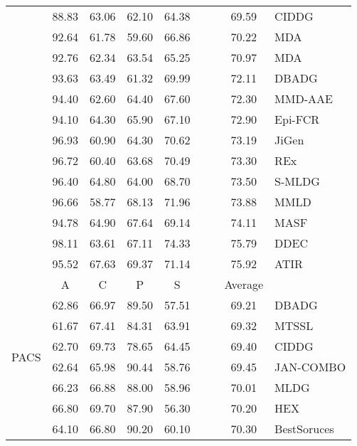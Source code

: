 \documentclass{article}
\begin{document}
\begin{table}
\begin{center}
\begin{small}
{\begin{tabular}{p{1.5cm}cccccccl}
& 88.83 & 63.06 & 62.10 & 64.38 &       &       & 69.59 & CIDDG \citep{li2018deep}\\
& 92.64 & 61.78 & 59.60 & 66.86 &       &       & 70.22 & MDA \citep{hu2019domain}\\
& 92.76 & 62.34 & 63.54 & 65.25 &       &       & 70.97 & MDA \citep{ding2017deep}\\
& 93.63 & 63.49 & 61.32 & 69.99 &       &       & 72.11 & DBADG \citep{Li_2017_ICCV}\\
& 94.40 & 62.60 & 64.40 & 67.60 &       &       & 72.30 & MMD-AAE \citep{li2018domain}\\
& 94.10 & 64.30 & 65.90 & 67.10 &       &       & 72.90 & Epi-FCR \citep{li2019episodic}\\
& 96.93 & 60.90 & 64.30 & 70.62 &       &       & 73.19 & JiGen \citep{carlucci2019domain}\\
& 96.72 & 60.40 & 63.68 & 70.49 &       &       & 73.30 & REx \citep{krueger2020out}\\
& 96.40 & 64.80 & 64.00 & 68.70 &       &       & 73.50 & S-MLDG \citep{li2020sequential}\\
& 96.66 & 58.77 & 68.13 & 71.96 &       &       & 73.88 & MMLD \citep{matsuura2019domain}\\
& 94.78 & 64.90 & 67.64 & 69.14 &       &       & 74.11 & MASF \citep{dou2019domain}\\
& 98.11 & 63.61 & 67.11 & 74.33 &       &       & 75.79 & DDEC \citep{asadi2019towards}\\
& 95.52 & 67.63 & 69.37 & 71.14 &       &       & 75.92 & ATIR \citep{albuquerque2019a}\\
\midrule
\multirow{20}{*}{PACS}&     A &     C &     P &     S &       &       & Average & \\
& 62.86 & 66.97 & 89.50 & 57.51 &       &       & 69.21 & DBADG \citep{Li_2017_ICCV}\\
& 61.67 & 67.41 & 84.31 & 63.91 &       &       & 69.32 & MTSSL \citep{albuquerque2020i}\\
& 62.70 & 69.73 & 78.65 & 64.45 &       &       & 69.40 & CIDDG \citep{li2018deep}\\
& 62.64 & 65.98 & 90.44 & 58.76 &       &       & 69.45 & JAN-COMBO \citep{rahman2019multi}\\
& 66.23 & 66.88 & 88.00 & 58.96 &       &       & 70.01 & MLDG \citep{li2018learning}\\
& 66.80 & 69.70 & 87.90 & 56.30 &       &       & 70.20 & HEX \citep{wang2019learning}\\
& 64.10 & 66.80 & 90.20 & 60.10 &       &       & 70.30 & BestSoruces \citep{mancini2018best}\\

\end{tabular}}
\end{small}
\end{center}
\end{table}
\end{document}

